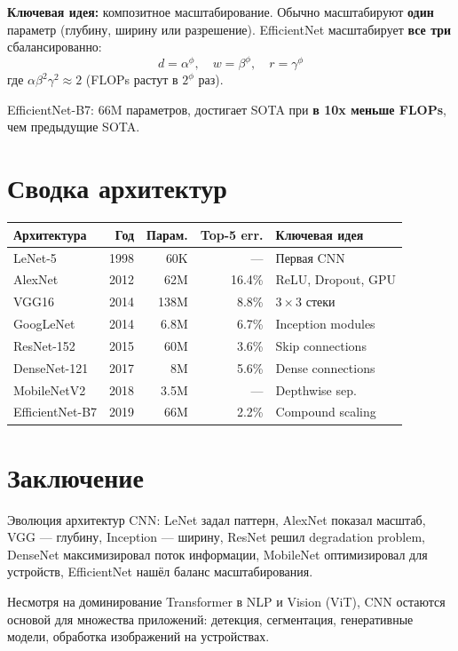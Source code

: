 \documentclass[a4paper,12pt]{article}
\begin{document}
\textbf{Ключевая идея:} композитное масштабирование. Обычно масштабируют \textbf{один} параметр (глубину, ширину или разрешение). EfficientNet масштабирует \textbf{все три} сбалансированно:
\[
d = \alpha^\phi, \quad w = \beta^\phi, \quad r = \gamma^\phi
\]
где $\alpha\beta^2\gamma^2 \approx 2$ (FLOPs растут в $2^\phi$ раз).

EfficientNet-B7: 66M параметров, достигает SOTA при \textbf{в 10x меньше FLOPs}, чем предыдущие SOTA.

\section{Сводка архитектур}

\begin{center}
\begin{tabular}{lrrrl}
\toprule
\textbf{Архитектура} & \textbf{Год} & \textbf{Парам.} & \textbf{Top-5 err.} & \textbf{Ключевая идея} \\
\midrule
LeNet-5 & 1998 & 60K & — & Первая CNN \\
AlexNet & 2012 & 62M & 16.4\% & ReLU, Dropout, GPU \\
VGG16 & 2014 & 138M & 8.8\% & $3\times3$ стеки \\
GoogLeNet & 2014 & 6.8M & 6.7\% & Inception modules \\
ResNet-152 & 2015 & 60M & 3.6\% & Skip connections \\
DenseNet-121 & 2017 & 8M & 5.6\% & Dense connections \\
MobileNetV2 & 2018 & 3.5M & — & Depthwise sep. \\
EfficientNet-B7 & 2019 & 66M & 2.2\% & Compound scaling \\
\bottomrule
\end{tabular}
\end{center}

\section{Заключение}

Эволюция архитектур CNN: LeNet задал паттерн, AlexNet показал масштаб, VGG — глубину, Inception — ширину, ResNet решил degradation problem, DenseNet максимизировал поток информации, MobileNet оптимизировал для устройств, EfficientNet нашёл баланс масштабирования.

Несмотря на доминирование Transformer в NLP и Vision (ViT), CNN остаются основой для множества приложений: детекция, сегментация, генеративные модели, обработка изображений на устройствах.
\end{document}
